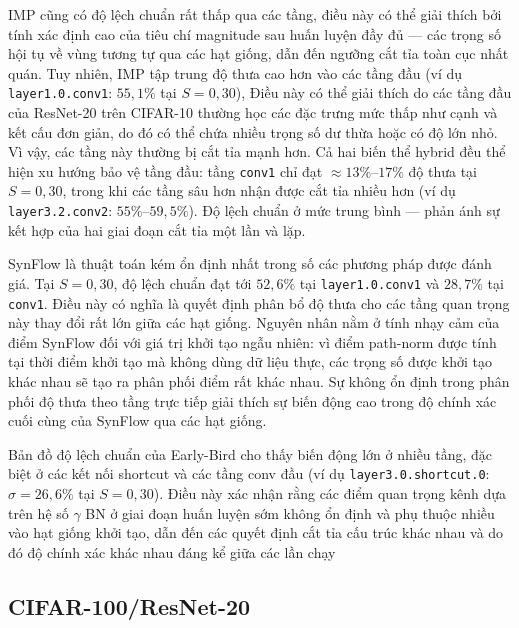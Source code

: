         IMP cũng có độ lệch chuẩn rất thấp qua các tầng, điều này có thể giải thích bởi tính xác định
        cao của tiêu chí magnitude sau huấn luyện đầy đủ — các trọng số hội tụ về vùng tương tự qua
        các hạt giống, dẫn đến ngưỡng cắt tỉa toàn cục nhất quán. %
        Tuy nhiên, IMP tập trung độ thưa cao hơn vào các tầng đầu (ví dụ
        \texttt{layer1.0.conv1}: $55{,}1\%$ tại $S=0{,}30$), Điều này có thể giải thích do
        các tầng đầu của ResNet-20 trên CIFAR-10 thường học các đặc trưng mức thấp như cạnh
        và kết cấu đơn giản, do đó có thể chứa nhiều trọng số dư thừa hoặc có độ lớn nhỏ. Vì
        vậy, các tầng này thường bị cắt tỉa mạnh hơn.
        Cả hai biến thể hybrid đều thể hiện xu hướng bảo vệ tầng đầu: tầng \texttt{conv1}
        chỉ đạt $\approx13\%$--$17\%$ độ thưa tại $S=0{,}30$, trong khi các tầng sâu hơn nhận
        được cắt tỉa nhiều hơn (ví dụ \texttt{layer3.2.conv2}: $55\%$--$59{,}5\%$).
        Độ lệch chuẩn ở mức trung bình --- 
        phản ánh sự kết hợp của hai giai đoạn cắt tỉa một lần và lặp. 

        SynFlow là thuật toán kém ổn định nhất trong số các phương pháp được đánh giá.
        Tại $S=0{,}30$, độ lệch chuẩn đạt tới $52{,}6\%$ tại \texttt{layer1.0.conv1} và $28{,}7\%$
        tại \texttt{conv1}. Điều này có nghĩa là quyết định phân bổ độ thưa cho các tầng quan
        trọng này thay đổi rất lớn giữa các hạt giống.
        Nguyên nhân nằm ở tính nhạy cảm của điểm SynFlow đối với giá trị khởi tạo ngẫu nhiên:
        vì điểm path-norm được tính tại thời điểm khởi tạo mà không dùng dữ liệu thực, các trọng %
        số được khởi tạo khác nhau sẽ tạo ra phân phối điểm rất khác nhau.
        Sự không ổn định trong phân phối độ thưa theo tầng trực tiếp giải thích sự biến động cao
        trong độ chính xác cuối cùng của SynFlow qua các hạt giống.
        
        Bản đồ độ lệch chuẩn của Early-Bird cho thấy biến động lớn ở nhiều tầng, đặc biệt ở các
        kết nối shortcut và các tầng conv đầu (ví dụ \texttt{layer3.0.shortcut.0}: $\sigma=26{,}6\%$ %
        tại $S=0{,}30$).
        Điều này xác nhận rằng các điểm quan trọng kênh dựa trên hệ số $\gamma$ BN ở giai đoạn
        huấn luyện sớm không ổn định và phụ thuộc nhiều vào hạt giống khởi tạo, dẫn đến các quyết
        định cắt tỉa cấu trúc khác nhau và do đó độ chính xác khác nhau đáng kể giữa các lần chạy


        \subsection{CIFAR-100/ResNet-20}

